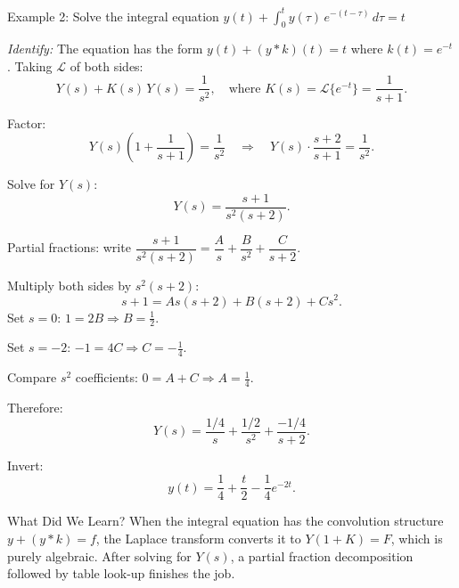 \documentclass[12pt,a4paper]{article}
\begin{document}
\begin{infobox}{Example 2: Solve the integral equation $y(t) + \int_0^t y(\tau)\,e^{-(t-\tau)}\,d\tau = t$}

\textit{Identify:} The equation has the form $y(t) + (y * k)(t) = t$ where
$k(t) = e^{-t}$. Taking $\mathcal{L}$ of both sides:
\[
  Y(s) + K(s)\,Y(s) = \frac{1}{s^2},
  \quad \text{where } K(s) = \mathcal{L}\{e^{-t}\} = \frac{1}{s+1}.
\]

Factor:
\[
  Y(s)\!\left(1 + \frac{1}{s+1}\right) = \frac{1}{s^2}
  \quad\Longrightarrow\quad
  Y(s)\cdot\frac{s+2}{s+1} = \frac{1}{s^2}.
\]

Solve for $Y(s)$:
\[
  Y(s) = \frac{s+1}{s^2(s+2)}.
\]

Partial fractions: write $\dfrac{s+1}{s^2(s+2)} = \dfrac{A}{s} + \dfrac{B}{s^2} + \dfrac{C}{s+2}$.

Multiply both sides by $s^2(s+2)$:
\[
  s+1 = As(s+2) + B(s+2) + Cs^2.
\]
Set $s=0$: $1 = 2B \Rightarrow B = \tfrac{1}{2}$.

Set $s=-2$: $-1 = 4C \Rightarrow C = -\tfrac{1}{4}$.

Compare $s^2$ coefficients: $0 = A + C \Rightarrow A = \tfrac{1}{4}$.

Therefore:
\[
  Y(s) = \frac{1/4}{s} + \frac{1/2}{s^2} + \frac{-1/4}{s+2}.
\]

Invert:
\[
  \boxed{y(t) = \frac{1}{4} + \frac{t}{2} - \frac{1}{4}e^{-2t}.}
\]
\end{infobox}

\begin{learnbox}{What Did We Learn?}
When the integral equation has the convolution structure $y + (y*k) = f$, the
Laplace transform converts it to $Y(1+K) = F$, which is purely algebraic.
After solving for $Y(s)$, a partial fraction decomposition followed by table
look-up finishes the job.
\end{learnbox}

\medskip
\end{document}
